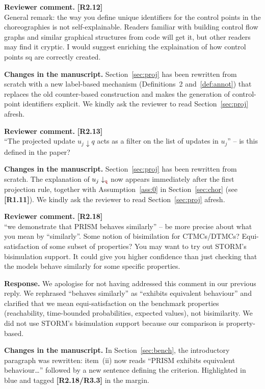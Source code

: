 \documentclass[11pt]{article}
\newcommand{\projE}[2]{#1\downarrow_{#2}}
\newcommand{\role}[1]{\textcolor{bloodyred}{\mathtt{#1}}}
\newcommand{\revcomment}[1]{%
  \begin{reviewercomment}
  \textbf{Reviewer comment.} #1
  \end{reviewercomment}
}
\newcommand{\revresponse}[2][]{%
  \par\noindent\textbf{Response.} #1 #2
}
\newcommand{\revchanges}[2][]{%
  \par\noindent\textbf{Changes in the manuscript.} #1
  #2\par\bigskip
}
\begin{document}
\revcomment{\textbf{[R2.12]}\\
General remark: the way you define unique identifiers for the
control points in the choreographies is not self-explainable.
Readers familiar with building control flow graphs and similar
graphical structures from code will get it, but other readers may
find it cryptic. I would suggest enriching the explaination of how
control points sq are correctly created.
}

\revchanges{ Section~\ref{sec:proj} has been rewritten from scratch
  with a new label-based mechanism (Definitions~2
  and~\ref{def:annot}) that replaces the old counter-based
  construction and makes the generation of control-point
  identifiers explicit. We kindly ask the reviewer to read
  Section~\ref{sec:proj} afresh.}


\revcomment{\textbf{[R2.13]}\\
``The projected update $u_j \downarrow q$ acts as a filter on the
list of updates in $u_j$'' -- is this defined in the paper?
}

\revchanges{ Section~\ref{sec:proj} has been rewritten from scratch.
  The explanation of $\projE{u_j}{\role q}$ now appears immediately
  after the first projection rule, together with
  Assumption~\ref{ass:0} in Section~\ref{sec:chor} (see
  \textbf{[R1.11]}). We kindly ask the reviewer to read
  Section~\ref{sec:proj} afresh.}


\revcomment{\textbf{[R2.18]}\\
``we demonstrate that PRISM behaves similarly'' -- be more precise
about what you mean by ``similarly''. Some notion of bisimilation for
CTMCs/DTMCs? Equi-satisfaction of some subset of properties? You may
want to try out STORM's bisimulation support. It could give you
higher confidence than just checking that the models behave
similarly for some specific properties.
}

\revresponse{ We apologise for not having addressed this comment in
  our previous reply. We rephrased ``behaves similarly'' as
  ``exhibits equivalent behaviour'' and clarified that we mean
  equi-satisfaction on the benchmark properties (reachability,
  time-bounded probabilities, expected values), not bisimilarity.
  We did not use STORM's bisimulation support because our
  comparison is property-based.}

\revchanges{ In Section~\ref{sec:bench}, the introductory paragraph
  was rewritten: item~(ii) now reads ``PRISM exhibits equivalent
  behaviour\ldots'' followed by a new sentence defining the
  criterion. Highlighted in blue and tagged \textbf{[R2.18/R3.3]}
  in the margin.}
\end{document}
